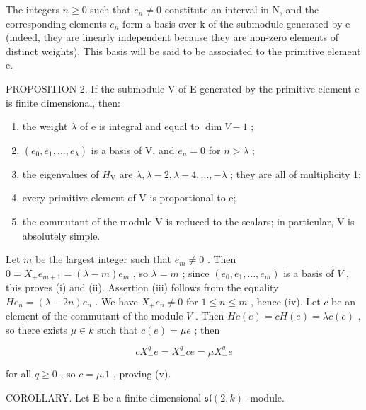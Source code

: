 The integers \(n \geq 0\) such that \(e_{n} \neq 0\) constitute an interval in N, and the corresponding elements \(e_{n}\) form a basis over k of the submodule generated by e (indeed, they are linearly independent because they are non-zero elements of distinct weights). This basis will be said to be associated to the primitive element e.

PROPOSITION 2. If the submodule V of E generated by the primitive element e is finite dimensional, then:

\begin{enumerate}
\def\labelenumi{(\roman{enumi})}
\item
  the weight \(\lambda\) of e is integral and equal to \(\dim V - 1\) ;
\item
  \((e_0, e_1, \ldots, e_\lambda)\) is a basis of V, and \(e_n = 0\) for \(n > \lambda\) ;
\item
  the eigenvalues of \(H_{\mathrm{V}}\) are \(\lambda, \lambda - 2, \lambda - 4, \ldots, -\lambda\) ; they are all of multiplicity 1;
\item
  every primitive element of V is proportional to e;
\item
  the commutant of the module \(\mathrm{V}\) is reduced to the scalars; in particular, \(\mathrm{V}\) is absolutely simple.
\end{enumerate}

Let \(m\) be the largest integer such that \(e_m \neq 0\) . Then \(0 = X_{+}e_{m+1} = (\lambda - m)e_m\) , so \(\lambda = m\) ; since \((e_0, e_1, \ldots, e_m)\) is a basis of \(V\) , this proves (i) and (ii). Assertion (iii) follows from the equality \(He_n = (\lambda - 2n)e_n\) . We have \(X_{+}e_n \neq 0\) for \(1 \leq n \leq m\) , hence (iv). Let \(c\) be an element of the commutant of the module \(V\) . Then \(Hc(e) = cH(e) = \lambda c(e)\) , so there exists \(\mu \in k\) such that \(c(e) = \mu e\) ; then

\[
c X _ {-} ^ {q} e = X _ {-} ^ {q} c e = \mu X _ {-} ^ {q} e
\]

for all \(q \geq 0\) , so \(c = \mu.1\) , proving (v).

COROLLARY. Let E be a finite dimensional \(\mathfrak{sl}(2,k)\) -module.

